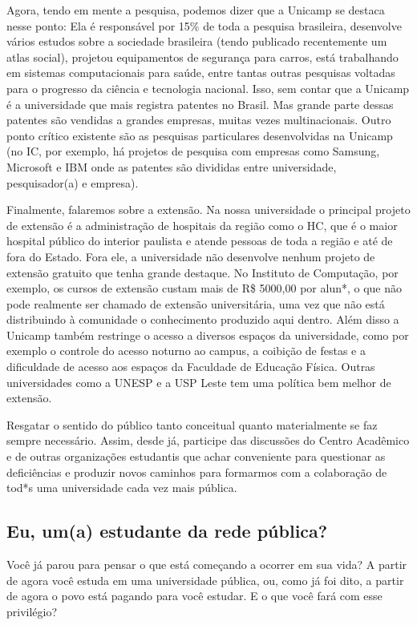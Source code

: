 Agora, tendo em mente a pesquisa, podemos dizer que a Unicamp se destaca nesse
ponto: Ela é responsável por 15\% de toda a pesquisa brasileira, desenvolve
vários estudos sobre a sociedade brasileira (tendo publicado recentemente um
atlas social), projetou equipamentos de segurança para carros, está trabalhando
em sistemas computacionais para saúde, entre tantas outras pesquisas voltadas
para o progresso da ciência e tecnologia nacional. Isso, sem contar que a
Unicamp é a universidade que mais registra patentes no Brasil. Mas grande parte
dessas patentes são vendidas a grandes empresas, muitas vezes multinacionais.
Outro ponto crítico existente são as pesquisas particulares desenvolvidas na
Unicamp (no IC, por exemplo, há projetos de pesquisa com empresas como Samsung,
Microsoft e IBM onde as patentes são divididas entre universidade,
pesquisador(a) e empresa).

Finalmente, falaremos sobre a extensão. Na nossa universidade o principal
projeto de extensão é a administração de hospitais da região como o HC, que é o
maior hospital público do interior paulista e atende pessoas de toda a região e
até de fora do Estado. Fora ele, a universidade não desenvolve nenhum projeto de
extensão gratuito que tenha grande destaque. No Instituto de Computação, por
exemplo, os cursos de extensão custam mais de R\$ 5000,00 por alun*, o que não
pode realmente ser chamado de extensão universitária, uma vez que não está
distribuindo à comunidade o conhecimento produzido aqui dentro.  Além disso a
Unicamp também restringe o acesso a diversos espaços da universidade, como por
exemplo o controle do acesso noturno ao campus, a coibição de festas e a
dificuldade de acesso aos espaços da Faculdade de Educação Física. Outras
universidades como a UNESP e a USP Leste tem uma política bem melhor de
extensão.

Resgatar o sentido do público tanto conceitual quanto materialmente se faz
sempre necessário. Assim, desde já, participe das discussões do Centro Acadêmico
e de outras organizações estudantis que achar conveniente para questionar as
deficiências e produzir novos caminhos para formarmos com a colaboração de tod*s
uma universidade cada vez mais pública.

\subsection*{Eu, um(a) estudante da rede pública?}

Você já parou para pensar o que está começando a ocorrer em sua vida? A partir
de agora você estuda em uma universidade pública, ou, como já foi dito, a partir
de agora o povo está pagando para você estudar. E o que você fará com esse
privilégio?

